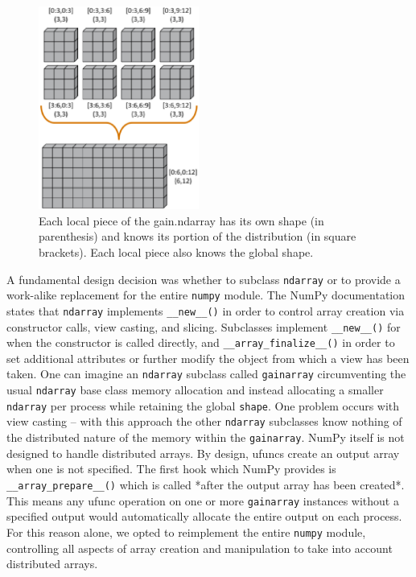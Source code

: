\documentclass[preprint]{sigplanconf}
\begin{document}
\begin{figure}[htb]
\centering
\includegraphics[width=0.47\textwidth]{image1_crop.eps}
\caption{
Each local piece of the gain.ndarray has its own shape (in parenthesis)
and knows its portion of the distribution (in square brackets).  Each local
piece also knows the global shape.
}
\label{fig:1}
\end{figure}

A fundamental design decision was whether to subclass \verb=ndarray= or to
provide a work-alike replacement for the entire \verb=numpy= module. The NumPy
documentation states that \verb=ndarray= implements \verb=__new__()= in order
to control array creation via constructor calls, view casting, and slicing.
Subclasses implement \verb=__new__()= for when the constructor is called
directly, and \linebreak\verb=__array_finalize__()= in order to set additional
attributes or further modify the object from which a view has been taken. One
can imagine an \verb=ndarray= subclass called \verb=gainarray= circumventing
the usual \verb=ndarray= base class memory allocation and instead allocating a
smaller \verb=ndarray= per process while retaining the global \verb=shape=.
One problem occurs with view casting -- with this approach the other
\verb=ndarray= subclasses know nothing of the distributed nature of the memory
within the \verb=gainarray=. NumPy itself is not designed to handle
distributed arrays. By design, ufuncs create an output array when one is not
specified. The first hook which NumPy provides is \verb=__array_prepare__()=
which is called *after the output array has been created*. This means any
ufunc operation on one or more \verb=gainarray= instances without a specified
output would automatically allocate the entire output on each process. For
this reason alone, we opted to reimplement the entire \verb=numpy= module,
controlling all aspects of array creation and manipulation to take into
account distributed arrays.
\end{document}
